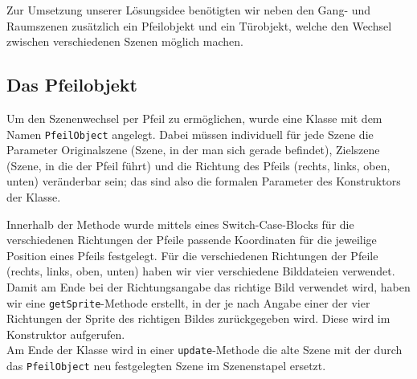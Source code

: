 Zur Umsetzung unserer Lösungsidee benötigten wir neben den Gang- und Raumszenen zusätzlich ein Pfeilobjekt und ein Türobjekt, welche den Wechsel zwischen verschiedenen Szenen möglich machen.

\subsection{Das Pfeilobjekt}
\begin{sloppypar}
Um den Szenenwechsel per Pfeil zu ermöglichen, wurde eine Klasse mit dem Namen \texttt{PfeilObject} angelegt. Dabei müssen individuell für jede Szene die Parameter Originalszene (Szene, in der man sich gerade befindet), Zielszene (Szene, in die der Pfeil führt) und die Richtung des Pfeils (rechts, links, oben, unten) veränderbar sein; das sind also die formalen Parameter des Konstruktors der Klasse.

Innerhalb der Methode wurde mittels eines Switch-Case-Blocks für die verschiedenen Richtungen der Pfeile passende Koordinaten für die jeweilige Position eines Pfeils festgelegt. Für die verschiedenen Richtungen der Pfeile (rechts, links, oben, unten) haben wir vier verschiedene Bilddateien verwendet. \\
Damit am Ende bei der Richtungsangabe das richtige Bild verwendet wird, haben wir eine \texttt{getSprite}-Methode erstellt, in der je nach Angabe einer der vier Richtungen der Sprite des richtigen Bildes zurückgegeben wird. Diese wird im Konstruktor aufgerufen. \\
Am Ende der Klasse wird in einer \texttt{update}-Methode die alte Szene mit der durch das \texttt{PfeilObject} neu festgelegten Szene im Szenenstapel ersetzt.
\end{sloppypar}


